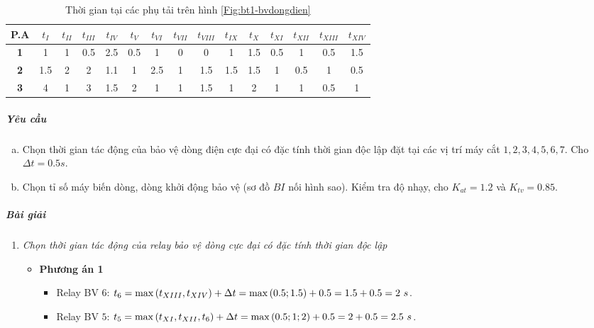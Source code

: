 \documentclass[12pt,a4paper]{article}
\begin{document}
\begin{enumerate}[1.]
		\begin{table}[!h]
				\begin{center}
					\begin{tabular}{|c|c|c|c|c|c|c|c|c|c|c|c|c|c|c|} \hline 
						\textbf{P.A} & $t_{I}$ & $t_{II}$ & $t_{III}$ & $t_{IV}$ & $t_{V}$ & $t_{VI}$ & $t_{VII}$ & $t_{VIII}$ & $t_{IX}$ & $t_{X}$ & $t_{XI}$ & $t_{XII}$ & $t_{XIII}$ & $t_{XIV}$ \\ \hline 
						\textbf{1} & 1 & 1 & 0.5 & 2.5 & 0.5 & 1 & 0 & 0 & 1 & 1.5 & 0.5 & 1 & 0.5 & 1.5 \\ \hline 
						\textbf{2} & 1.5 & 2 & 2 & 1.1 & 1 & 2.5 & 1 & 1.5 & 1.5 & 1.5 & 1 & 0.5 & 1 & 0.5 \\ \hline 
						\textbf{3} & 4 & 1 & 3 & 1.5 & 2 & 1 & 1 & 1.5 & 1 & 2 & 1 & 1 & 0.5 & 1 \\ \hline					
						\end{tabular}
				\end{center}
				\caption{Thời gian tại các phụ tải trên hình \ref{Fig:bt1-bvdongdien}} \label{Tab:bt1-bvdongdien-thoigian}
			\end{table}	
			
		\subparagraph{Yêu cầu}
			\begin{enumerate}[a.]
				\item Chọn thời gian tác động của bảo vệ dòng điện cực đại có đặc tính thời gian độc lập đặt tại các vị trí máy cắt $1, 2, 3, 4, 5, 6, 7$. Cho $\Delta t = 0.5\unit{s}$.
				
				\item Chọn tỉ số máy biến dòng, dòng khởi động bảo vệ (sơ đồ $BI$ nối hình sao). Kiểm tra độ nhạy, cho $K_{at} = 1.2$ và $K_{tv} = 0.85$.
			\end{enumerate}

		\subparagraph{Bài giải}
			\begin{enumerate}[\it a.]
				\item \emph{Chọn thời gian tác động của relay bảo vệ dòng cực đại có đặc tính thời gian độc lập}
					\begin{itemize}
						\item \textbf{Phương án 1}
							\begin{itemize}
								\item Relay BV $6$: $t_6 = \max\left({t_{XIII}, t_{XIV}}\right) + \Delta t = \max\left({0.5; 1.5}\right) + 0.5 = 1.5 + 0.5 = 2~s$.
								
								\item Relay BV $5$: $t_5 = \max\left({t_{XI}, t_{XII}, t_{6}}\right) + \Delta t = \max\left({0.5; 1; 2}\right) + 0.5 = 2 + 0.5 = 2.5~s$.
								

\end{itemize}
\end{itemize}
\end{enumerate}
\end{enumerate}
\end{document}
